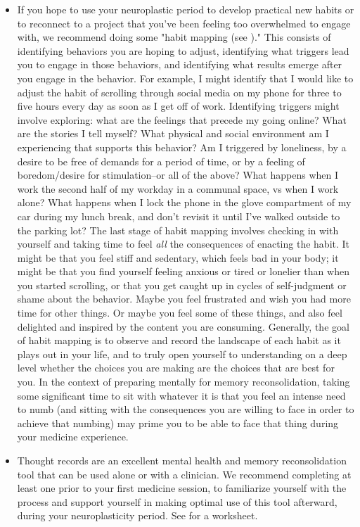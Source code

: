 \documentclass[12pt,letterpaper]{book}
\begin{document}
\begin{itemize}
    \item {} If you hope to use your neuroplastic period to develop practical new habits or to reconnect to a project that you've been feeling too overwhelmed to engage with, we recommend doing some "habit mapping (see \textcite{habitMapping})." This consists of identifying behaviors you are hoping to adjust, identifying what triggers lead you to engage in those behaviors, and identifying what results emerge after you engage in the behavior. For example, I might identify that I would like to adjust the habit of scrolling through social media on my phone for three to five hours every day as soon as I get off of work. Identifying triggers might involve exploring: what are the feelings that precede my going online? What are the stories I tell myself? What physical and social environment am I experiencing that supports this behavior? Am I triggered by loneliness, by a desire to be free of demands for a period of time, or by a feeling of boredom/desire for stimulation–or all of the above? What happens when I work the second half of my workday in a communal space, vs when I work alone? What happens when I lock the phone in the glove compartment of my car during my lunch break, and don't revisit it until I've walked outside to the parking lot? The last stage of habit mapping involves checking in with yourself and taking time to feel \textit{all} the consequences of enacting the habit. It might be that you feel stiff and sedentary, which feels bad in your body; it might be that you find yourself feeling anxious or tired or lonelier than when you started scrolling, or that you get caught up in cycles of self-judgment or shame about the behavior. Maybe you feel frustrated and wish you had more time for other things. Or maybe you feel some of these things, and also feel delighted and inspired by the content you are consuming. Generally, the goal of habit mapping is to observe and record the landscape of each habit as it plays out in your life, and to truly open yourself to understanding on a deep level whether the choices you are making are the choices that are best for you. In the context of preparing mentally for memory reconsolidation, taking some significant time to sit with whatever it is that you feel an intense need to numb (and sitting with the consequences you are willing to face in order to achieve that numbing) may prime you to be able to face that thing during your medicine experience.
    \item {} Thought records are an excellent mental health and memory reconsolidation tool that can be used alone or with a clinician. We recommend completing at least one prior to your first medicine session, to familiarize yourself with the process and support yourself in making optimal use of this tool afterward, during your neuroplasticity period. See \textcite{harperThought} for a worksheet.

\end{itemize}
\end{document}
